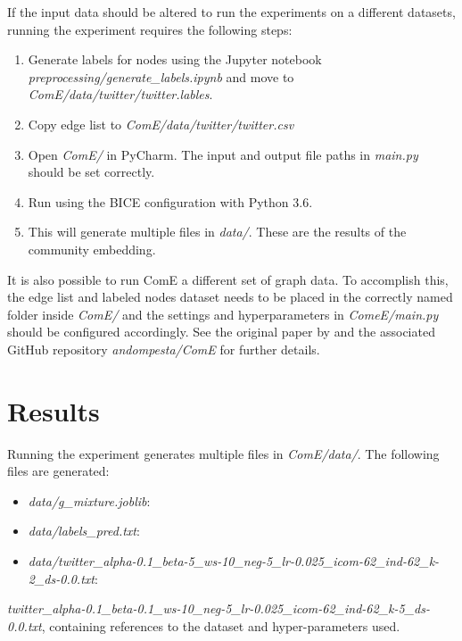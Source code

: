 \documentclass[sigconf]{acmart}
\begin{document}
If the input data should be altered to run the experiments on a different datasets, running the experiment requires the following steps:

\begin{enumerate}
	\item Generate labels for nodes using the Jupyter notebook \textit{preprocessing/generate\_labels.ipynb} and move to \textit{ComE/data/twitter/twitter.lables}.
	\item Copy edge list to \textit{ComE/data/twitter/twitter.csv}
	\item Open \textit{ComE/} in PyCharm. The input and output file paths in \textit{main.py} should be set correctly.
	\item Run using the BICE configuration with Python 3.6.
	\item This will generate multiple files in \textit{data/}. These are the results of the community embedding.
\end{enumerate}

It is also possible to run ComE a different set of graph data. To accomplish this, the edge list and labeled nodes dataset needs to be placed in the correctly named folder inside \textit{ComE/} and the settings and hyperparameters in \textit{ComeE/main.py} should be configured accordingly. See the original paper by \citeauthor{Cav17}\cite{Cav17} and the associated GitHub repository \textit{andompesta/ComE}\cite{ComE} for further details.

\section{Results}

Running the experiment generates multiple files in \textit{ComE/data/}. The following files are generated:
\begin{itemize}
	\item \textit{data/g_mixture.joblib}:
	\item \textit{data/labels_pred.txt}:
	\item \textit{data/twitter_alpha-0.1_beta-5_ws-10_neg-5_lr-0.025_icom-62_ind-62_k-2_ds-0.0.txt}: 
\end{itemize}

\textit{twitter\_alpha-0.1\_beta-0.1\_ws-10\_neg-5\_lr-0.025\_icom-62\_ind-62\_k-5\_ds-0.0.txt}, containing references to the dataset and hyper-parameters used.
\end{document}
